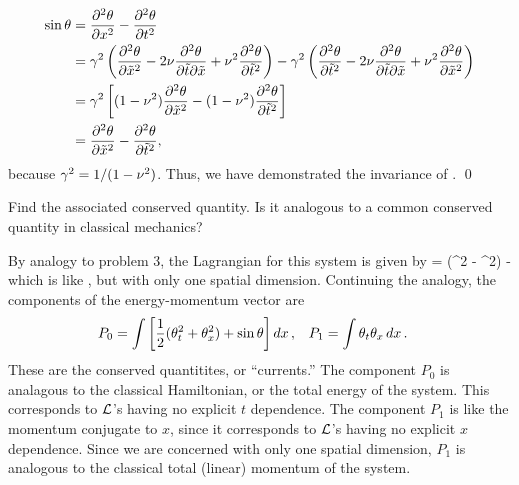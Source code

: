 \begin{solution}
\begin{align*}
		\sin{\theta} &= \pdv[2]{\theta}{x} - \pdv[2]{\theta}{t} \\
		&= \gamma^2 \left( \pdv[2]{\theta}{\tilde{x}} - 2 \nu \pdv{\theta}{\tilde{t}}{\tilde{x}} + \nu^2 \pdv[2]{\theta}{\tilde{t}} \right) - \gamma^2 \left( \pdv[2]{\theta}{\tilde{t}} - 2 \nu \pdv{\theta}{\tilde{t}}{\tilde{x}} + \nu^2 \pdv[2]{\theta}{\tilde{x}} \right) \\
		&= \gamma^2 \left[ (1 - \nu^2) \pdv[2]{\theta}{\tilde{x}} - (1 - \nu^2) \pdv[2]{\theta}{\tilde{t}} \right] \\
		&= \pdv[2]{\theta}{\tilde{x}} - \pdv[2]{\theta}{\tilde{t}},
	\end{align*}
	because $\gamma^2 = 1 / (1 - \nu^2)$.  Thus, we have demonstrated the invariance of . \qed
\end{solution}

\begin{problem}
	Find the associated conserved quantity.  Is it analogous to a common conserved quantity in classical mechanics?
\end{problem}

\begin{solution}
	By analogy to problem 3, the Lagrangian for this system is given by
	\beq
		\Ld =  (\thtt^2 - \thtx^2) - \sint
	\eeq
	which is like , but with only one spatial dimension.  Continuing the analogy, the components of the energy-momentum vector are
	\begin{align*}
		P_0 &= \int \left[ \frac{1}{2} (\theta_t^2 + \theta_x^2) + \sin{\theta} \right] \dd{x}, &
		P_1 &= \int \theta_t \theta_x \dd{x}. &
	\end{align*}
	These are the conserved quantitites, or ``currents.''  The component $P_0$ is analagous to the classical Hamiltonian, or the total energy of the system.  This corresponds to $\mathcal{L}$'s having no explicit $t$ dependence.  The component $P_1$ is like the momentum conjugate to $x$, since it corresponds to $\mathcal{L}$'s having no explicit $x$ dependence.  Since we are concerned with only one spatial dimension, $P_1$ is analogous to the classical total (linear) momentum of the system.
\end{solution}